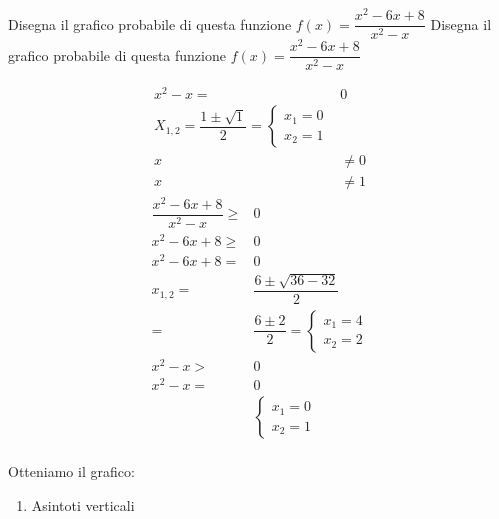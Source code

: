 \begin{exercise}
Disegna il grafico probabile di questa funzione $f(x)= \dfrac{x^2-6x+8}{x^2-x}$
	\tcblower
Disegna il grafico probabile di questa funzione $f(x)= \dfrac{x^2-6x+8}{x^2-x}$
	\begin{itemize}
	\begin{align*}
x^2-x=&0\\
X_{1,2}=\dfrac{1\pm\sqrt{1}}{2}
=\begin{cases}
x_1=0\\
x_2=1
\end{cases}\\
x&\neq 0\\
x&\neq 1
	\end{align*}
	\begin{align*}
	\dfrac{x^2-6x+8}{x^2-x}\geq&0\\
	x^2-6x+8\geq&0\\
	x^2-6x+8=&0\\
	x_{1,2}=&\dfrac{6\pm\sqrt{36-32}}{2}\\
	=&\dfrac{6\pm 2}{2}
	=\begin{cases}
	x_1=4\\
	x_2=2
	\end{cases}\\
	x^2-x>&0\\
	x^2-x=&0\\
	&\begin{cases}
	x_1=0\\
	x_2=1
	\end{cases}\\
	\end{align*}
	
	Otteniamo il grafico:
	\begin{center}
		
	\end{center}
	\begin{enumerate}
		\item Asintoti verticali
		

\end{enumerate}
\end{itemize}
\end{exercise}
